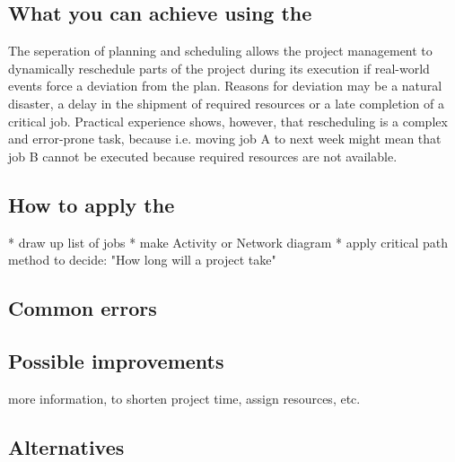 \subsection{What you can achieve using the \cpm}
The seperation of planning and scheduling allows the project management to dynamically reschedule
parts of the project during its execution if real-world events force a deviation from the plan.
Reasons for deviation may be a natural disaster, a delay in the shipment of required resources or
a late completion of a critical job. Practical experience shows, however, that rescheduling is a
complex and error-prone task, because i.e. moving job A to next week might mean that job B cannot be
executed because required resources are not available. %
\subsection{How to apply the \cpm}
* draw up list of jobs
* make Activity or Network diagram
* apply critical path method to decide: "How long will a project take"
\subsection{Common errors}
\subsection{Possible improvements}
more information, to shorten project time, assign resources, etc.

\subsection{Alternatives}
